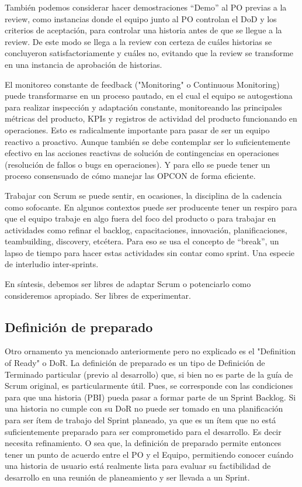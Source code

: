 También podemos considerar hacer demostraciones “Demo” al PO previas a la review, como instancias donde el equipo junto al PO controlan el DoD y los criterios de aceptación, para controlar una historia antes de que se llegue a la review. De este modo se llega a la review con certeza de cuáles historias se concluyeron satisfactoriamente y cuáles no, evitando que la review se transforme en una instancia de aprobación de historias.

El monitoreo constante de feedback ("Monitoring" o Continuous Monitoring) puede transformarse en un proceso pautado, en el cual el equipo se autogestiona para realizar inspección y adaptación constante, monitoreando las principales métricas del producto, KPIs y registros de actividad del producto funcionando en operaciones. Esto es radicalmente importante para pasar de ser un equipo reactivo a proactivo. Aunque también se debe contemplar ser lo suficientemente efectivo en las acciones reactivas de solución de contingencias en operaciones (resolución de fallos o bugs en operaciones). Y para ello se puede tener un proceso consensuado de cómo manejar las OPCON de forma eficiente.

Trabajar con Scrum se puede sentir, en ocasiones, la disciplina de la cadencia como sofocante. En algunos contextos puede ser producente tener un respiro para que el equipo trabaje en algo fuera del foco del producto o para trabajar en actividades como refinar el backlog, capacitaciones, innovación, planificaciones, teambuilding, discovery, etcétera. Para eso se usa el concepto de “break”, un lapso de tiempo para hacer estas actividades sin contar como sprint. Una especie de interludio inter-sprints.

En síntesis, debemos ser libres de adaptar Scrum o potenciarlo como consideremos apropiado. Ser libres de experimentar.

\subsection{Definición de preparado}

Otro ornamento ya mencionado anteriormente pero no explicado es el "Definition of Ready" o DoR. La definición de preparado es un tipo de Definición de Terminado particular (previo al desarrollo) que, si bien no es parte de la guía de Scrum original, es particularmente útil. Pues, se corresponde con las condiciones para que una historia (PBI) pueda pasar a formar parte de un Sprint Backlog. Si una historia no cumple con su DoR no puede ser tomado en una planificación para ser ítem de trabajo del Sprint planeado, ya que es un ítem que no está suficientemente preparado para ser comprometido para el desarrollo. Es decir necesita refinamiento. O sea que, la definición de preparado permite entonces tener un punto de acuerdo entre el PO y el Equipo, permitiendo conocer cuándo una historia de usuario está realmente lista para evaluar su factibilidad de desarrollo en una reunión de planeamiento y ser llevada a un Sprint.

